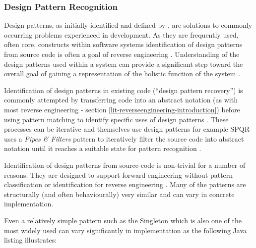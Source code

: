 \subsubsection{Design Pattern Recognition}\label{lit-reverseengineering-designpatterns}

Design patterns, as initially identified and defined by \cite{gamma1995design}, are solutions to commonly occurring problems experienced in development. As they are frequently used, often core, constructs within software systems identification of design patterns from source code is often a goal of reverse engineering \citep{rasoolsurvey,shi2006reverse,arcelli2005comparison,uchiyama2011design}. Understanding of the design patterns used within a system can provide a significant step toward the overall goal of gaining a representation of the holistic function of the system \citep{counsell2004design}.

Identification of design patterns in existing code (``design pattern recovery'') is commonly attempted by transferring code into an abstract notation (as with most reverse engineering - section \ref{lit-reverseengineering-introduction}) before using pattern matching to identify specific uses of design patterns \citep{shi2006reverse,rasoolsurvey}. These processes can be iterative and themselves use design patterns for example SPQR uses a \textit{Pipes \& Filters} pattern to iteratively filter the source code into abstract notation until it reaches a suitable state for pattern recognition \citep{flores2005reverse}.

Identification of design patterns from source-code is non-trivial for a number of reasons. They are designed to support forward engineering without pattern classification or identification for reverse engineering \citep{shi2006reverse}. Many of the patterns are structurally (and often behaviourally) very similar \citep{rasoolsurvey} and can vary in concrete implementation.

Even a relatively simple pattern such as the Singleton \citep{gamma1995design} which is also one of the most widely used \citep{uchiyama2011design} can vary significantly in implementation as the following Java listing illustrates:

